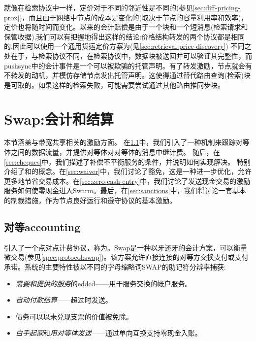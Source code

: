 就像在检索协议中一样，定价对于不同的邻近性是不同的(参见\ref{sec:diff-pricing-prox})，而且由于网络中节点的成本是变化的(取决于节点的容量利用率和效率)，定价也将随时间而变化。以来的会计赔偿是由于一个块和一个短消息(检索请求和保管收据),我们可以有把握地得出这样的结论:价格结构转发的两个协议都是相同的,因此可以使用一个通用货运定价方案为(见\ref{sec:retrieval-price-discovery})
不同之处在于，与检索协议不同，在检索协议中，数据块被送回并可以验证其完整性，而pushsync中的会计事件是一个可以被欺骗的托管声明。有了转发激励，节点就会有不转发的动机，并模仿存储节点发出托管声明。这使得通过替代路由查询(检索)块是可取的。如果这样的检索失败，可能需要尝试通过其他路由推同步块。 
 

\section{Swap:会计和结算}\label{sec:accounting-and-settlement}

\green{}

本节涵盖与带宽共享相关的激励方面。
在\ref{sec:accounting}中，我们引入了一种机制来跟踪对等体之间的数据流量，并提供对等体对对等体的消息中继计费。
随后，在\ref{sec:cheques}中，我们描述了补偿不平衡服务的条件，并说明如何实现解决。
特别介绍了和的概念。在\ref{sec:waiver}中，我们讨论了豁免，这是一种进一步优化，允许更多地节省交易成本。在\ref{sec:zero-cash-entry}中，我们讨论了发送现金交易的激励服务如何使零现金进入Swarm。最后，在\ref{sec:sanctions}中，我们将讨论一套基本的制裁措施，作为节点良好运行和遵守协议的基本激励。

\subsection{对等accounting\statusgreen}\label{sec:accounting}


\cite{ethersphere2016sw3}引入了一个点对点计费协议，称为。Swap是一种以牙还牙的会计方案，可以衡量微交易(参见\ref{spec:protocol:swap})。该方案允许直接连接的对等方交换支付或支付承诺。系统的主要特性被以不同的字母缩略词SWAP的助记符分辨率捕获:

\begin{itemize}
    \item \emph{需要和提供的服务}的eddcd——用于服务交换的帐户服务。
    \item \emph{自动付款结算}——超过时发送。
    \item 债务可以以未兑现支票的价值被免除。 
    \item \emph{白手起家}和\emph{用对等体发送}——通过单向互换支持零现金入账。
\end{itemize}


